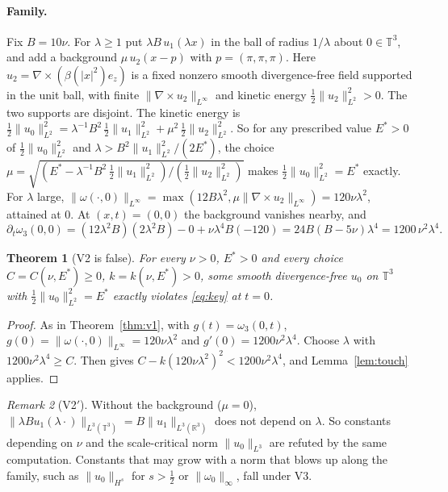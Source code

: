 \documentclass[11pt]{article}
\newcommand{\T}{\mathbb{T}^3}
\newcommand{\R}{\mathbb{R}}
\newtheorem{theorem}{Theorem}
\theoremstyle{remark}
\newtheorem{remark}[theorem]{Remark}
\newcommand{\lean}[1]{\path{#1}}
\begin{document}
\paragraph{Family.} Fix $B=10\nu$. For $\lambda\ge1$ put $\lambda B\,u_1(\lambda x)$ in the ball of radius $1/\lambda$ about
$0\in\T$, and add a background $\mu\,u_2(x-p)$ with $p=(\pi,\pi,\pi)$. Here $u_2=\nabla\times(\beta(|x|^2)e_z)$ is a fixed nonzero
smooth divergence-free field supported in the unit ball, with finite $\|\nabla\times u_2\|_{L^\infty}$ and kinetic energy $\tfrac12\|u_2\|_{L^2}^2>0$. The two supports are disjoint. The kinetic energy is
$\tfrac12\|u_0\|_{L^2}^2=\lambda^{-1}B^2\,\tfrac12\|u_1\|_{L^2}^2+\mu^2\,\tfrac12\|u_2\|_{L^2}^2$. So for any prescribed value $E^*>0$ of $\tfrac12\|u_0\|_{L^2}^2$ and $\lambda>B^2\|u_1\|_{L^2}^2/(2E^*)$,
the choice $\mu=\sqrt{(E^*-\lambda^{-1}B^2\,\tfrac12\|u_1\|_{L^2}^2)/(\tfrac12\|u_2\|_{L^2}^2)}$ makes $\tfrac12\|u_0\|_{L^2}^2=E^*$ exactly. For $\lambda$ large,
$\|\omega(\cdot,0)\|_{L^\infty}=\max(12B\lambda^2,\mu\|\nabla\times u_2\|_{L^\infty})=120\nu\lambda^2$, attained at $0$. At $(x,t)=(0,0)$ the background vanishes nearby, and
\[
\partial_t\omega_3(0,0)=(12\lambda^2B)(2\lambda^2B)-0+\nu\lambda^4B(-120)=24B(B-5\nu)\lambda^4=1200\,\nu^2\lambda^4 .
\]

\begin{theorem}[V2 is false]\label{thm:v2}
For every $\nu>0$, $E^*>0$ and every choice $C=C(\nu,E^*)\ge0$, $k=k(\nu,E^*)>0$, some smooth divergence-free $u_0$ on $\T$
with $\tfrac12\|u_0\|_{L^2}^2=E^*$ exactly violates \eqref{eq:key} at $t=0$.
\end{theorem}
\begin{proof}
As in Theorem~\ref{thm:v1}, with $g(t)=\omega_3(0,t)$, $g(0)=\|\omega(\cdot,0)\|_{L^\infty}=120\nu\lambda^2$ and $g'(0)=1200\nu^2\lambda^4$.
Choose $\lambda$ with $1200\nu^2\lambda^4\ge C$. Then \lean{localized_family_violation} gives
$C-k(120\nu\lambda^2)^2<1200\nu^2\lambda^4$, and Lemma~\ref{lem:touch} applies.
\end{proof}

\begin{remark}[V2$'$]\label{rem:l3}
Without the background ($\mu=0$), $\|\lambda Bu_1(\lambda\cdot)\|_{L^3(\T)}=B\|u_1\|_{L^3(\R^3)}$ does not depend on $\lambda$.
So constants depending on $\nu$ and the scale-critical norm $\|u_0\|_{L^3}$ are refuted by the same computation. Constants
that may grow with a norm that blows up along the family, such as $\|u_0\|_{H^s}$ for $s>\tfrac12$ or $\|\omega_0\|_\infty$,
fall under V3.
\end{remark}
\end{document}
